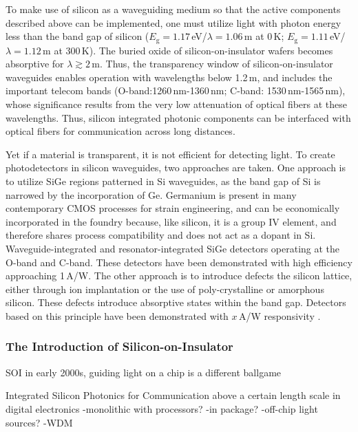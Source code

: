 To make use of silicon as a waveguiding medium so that the active components described above can be implemented, one must utilize light with photon energy less than the band gap of silicon ($E_{\mathrm{g}}=1.17$\,eV/$\lambda = 1.06$\,\textmu m at 0\,K; $E_{\mathrm{g}}=1.11$\,eV/$\lambda = 1.12$\,\textmu m at 300\,K). The buried oxide of silicon-on-insulator wafers becomes absorptive for $\lambda \gtrsim 2$\,\textmu m. Thus, the transparency window of silicon-on-insulator waveguides enables operation with wavelengths below 1.2\,\textmu m, and includes the important telecom bands (O-band:1260\,nm-1360\,nm; C-band: 1530\,nm-1565\,nm), whose significance results from the very low attenuation of optical fibers at these wavelengths. Thus, silicon integrated photonic components can be interfaced with optical fibers for communication across long distances. 

Yet if a material is transparent, it is not efficient for detecting light. To create photodetectors in silicon waveguides, two approaches are taken. One approach is to utilize SiGe regions patterned in Si waveguides, as the band gap of Si is narrowed by the incorporation of Ge. Germanium is present in many contemporary CMOS processes for strain engineering, and can be economically incorporated in the foundry because, like silicon, it is a group IV element, and therefore shares process compatibility and does not act as a dopant in Si. Waveguide-integrated \cite{} and resonator-integrated \cite{} SiGe detectors operating at the O-band and C-band. These detectors have been demonstrated with high efficiency approaching 1\,A/W. The other approach is to introduce defects the silicon lattice, either through ion implantation or the use of poly-crystalline or amorphous silicon. These defects introduce absorptive states within the band gap. Detectors based on this principle have been demonstrated with $x$\,A/W responsivity \cite{meor2014}. 

\subsubsection{The Introduction of Silicon-on-Insulator}
SOI in early 2000s, guiding light on a chip is a different ballgame

\vspace{3em}
Integrated Silicon Photonics for Communication above a certain length scale in digital electronics
-monolithic with processors?
-in package?
-off-chip light sources?
-WDM

